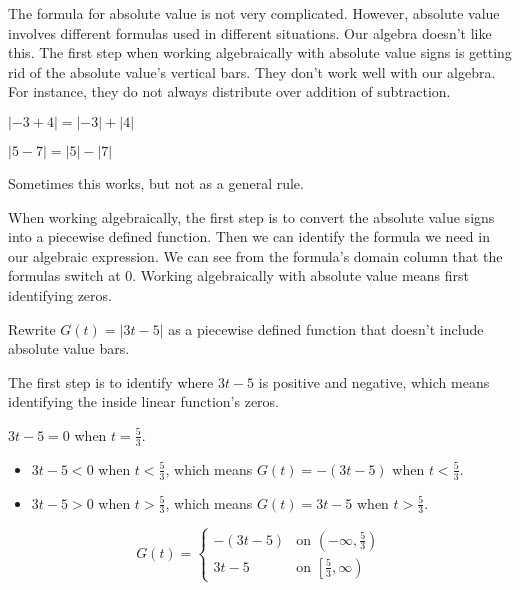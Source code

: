\documentclass{ximera}
\begin{document}
The formula for absolute value is not very complicated.  However, absolute value involves different formulas used in different situations.  Our algebra doesn't like this. The first step when working algebraically with absolute value signs is getting rid of the absolute value's vertical bars.  They don't work well with our algebra. For instance, they do not always distribute over addition of subtraction.


\begin{question}
$| -3 + 4 | = | -3 | + | 4 |$
  \begin{multipleChoice}
  \end{multipleChoice}
\end{question}


\begin{question}
$| 5 - 7 | = | 5 | - | 7 |$
  \begin{multipleChoice}
  \end{multipleChoice}
\end{question}


Sometimes this works, but not as a general rule.


When working algebraically, the first step is to convert the absolute value signs into a piecewise defined function. Then we can identify the formula we need in our algebraic expression.  We can see from the formula's domain column that the formulas switch at $0$. Working algebraically with absolute value means first identifying zeros.



\begin{example}


Rewrite $G(t) = | 3t - 5 |$ as a piecewise defined function that doesn't include absolute value bars.


\begin{explanation}
The first step is to identify where $3t - 5$ is positive and negative, which means identifying the inside linear function's zeros.



$3t-5=0$ when $t=\frac{5}{3}$.


\begin{itemize}
\item $3t - 5 < 0$ when $t<\tfrac{5}{3}$, which means $G(t) = -(3t - 5)$ when $t<\tfrac{5}{3}$.
\item $3t - 5 > 0$ when $t>\tfrac{5}{3}$, which means $G(t) = 3t - 5$ when $t>\tfrac{5}{3}$.
\end{itemize}





\[
G(t) = 
\begin{cases}
  -(3t-5) &\text{on $\left( -\infty, \tfrac{5}{3} \right)$} \\
  3t-5 &\text{on $\left[ \tfrac{5}{3}, \infty \right)$}
\end{cases}
\]

\end{explanation}




\end{example}
\end{document}
